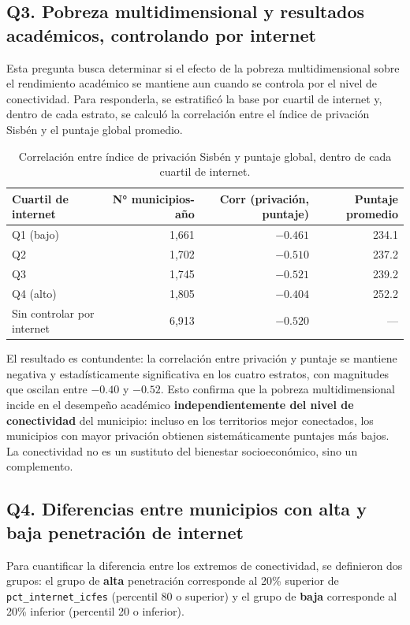 \subsection{Q3. Pobreza multidimensional y resultados académicos, controlando por internet}
Esta pregunta busca determinar si el efecto de la pobreza multidimensional sobre el rendimiento académico se mantiene aun cuando se controla por el nivel de conectividad. Para responderla, se estratificó la base por cuartil de internet y, dentro de cada estrato, se calculó la correlación entre el índice de privación Sisbén y el puntaje global promedio.

\begin{table}[H]
\centering
\caption{Correlación entre índice de privación Sisbén y puntaje global, dentro de cada cuartil de internet.}
\begin{tabular}{l r r r}
\toprule
\textbf{Cuartil de internet} & \textbf{N° municipios-año} & \textbf{Corr (privación, puntaje)} & \textbf{Puntaje promedio} \\
\midrule
Q1 (bajo)  & 1,661 & $-0.461$ & 234.1 \\
Q2         & 1,702 & $-0.510$ & 237.2 \\
Q3         & 1,745 & $-0.521$ & 239.2 \\
Q4 (alto)  & 1,805 & $-0.404$ & 252.2 \\
\midrule
Sin controlar por internet & 6,913 & $-0.520$ & --- \\
\bottomrule
\end{tabular}
\end{table}

El resultado es contundente: la correlación entre privación y puntaje se mantiene negativa y estadísticamente significativa en los cuatro estratos, con magnitudes que oscilan entre $-0.40$ y $-0.52$. Esto confirma que la pobreza multidimensional incide en el desempeño académico \textbf{independientemente del nivel de conectividad} del municipio: incluso en los territorios mejor conectados, los municipios con mayor privación obtienen sistemáticamente puntajes más bajos. La conectividad no es un sustituto del bienestar socioeconómico, sino un complemento.

\subsection{Q4. Diferencias entre municipios con alta y baja penetración de internet}
Para cuantificar la diferencia entre los extremos de conectividad, se definieron dos grupos: el grupo de \textbf{alta} penetración corresponde al 20\% superior de \texttt{pct\_internet\_icfes} (percentil 80 o superior) y el grupo de \textbf{baja} corresponde al 20\% inferior (percentil 20 o inferior).

